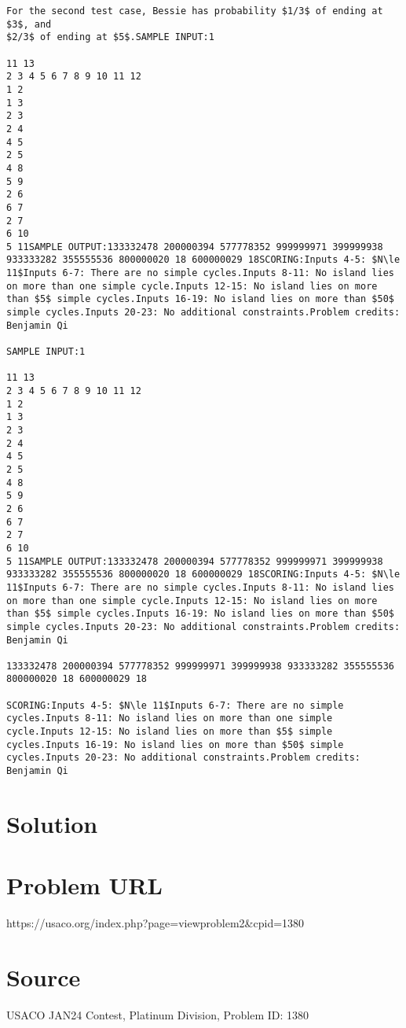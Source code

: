 \documentclass[12pt]{article}
\begin{document}
\begin{verbatim}
For the second test case, Bessie has probability $1/3$ of ending at $3$, and
$2/3$ of ending at $5$.SAMPLE INPUT:1

11 13
2 3 4 5 6 7 8 9 10 11 12
1 2
1 3
2 3
2 4
4 5
2 5
4 8
5 9
2 6
6 7
2 7
6 10
5 11SAMPLE OUTPUT:133332478 200000394 577778352 999999971 399999938 933333282 355555536 800000020 18 600000029 18SCORING:Inputs 4-5: $N\le 11$Inputs 6-7: There are no simple cycles.Inputs 8-11: No island lies on more than one simple cycle.Inputs 12-15: No island lies on more than $5$ simple cycles.Inputs 16-19: No island lies on more than $50$ simple cycles.Inputs 20-23: No additional constraints.Problem credits: Benjamin Qi

SAMPLE INPUT:1

11 13
2 3 4 5 6 7 8 9 10 11 12
1 2
1 3
2 3
2 4
4 5
2 5
4 8
5 9
2 6
6 7
2 7
6 10
5 11SAMPLE OUTPUT:133332478 200000394 577778352 999999971 399999938 933333282 355555536 800000020 18 600000029 18SCORING:Inputs 4-5: $N\le 11$Inputs 6-7: There are no simple cycles.Inputs 8-11: No island lies on more than one simple cycle.Inputs 12-15: No island lies on more than $5$ simple cycles.Inputs 16-19: No island lies on more than $50$ simple cycles.Inputs 20-23: No additional constraints.Problem credits: Benjamin Qi

133332478 200000394 577778352 999999971 399999938 933333282 355555536 800000020 18 600000029 18

SCORING:Inputs 4-5: $N\le 11$Inputs 6-7: There are no simple cycles.Inputs 8-11: No island lies on more than one simple cycle.Inputs 12-15: No island lies on more than $5$ simple cycles.Inputs 16-19: No island lies on more than $50$ simple cycles.Inputs 20-23: No additional constraints.Problem credits: Benjamin Qi
\end{verbatim}

\section*{Solution}


\section*{Problem URL}
https://usaco.org/index.php?page=viewproblem2&cpid=1380

\section*{Source}
USACO JAN24 Contest, Platinum Division, Problem ID: 1380
\end{document}
